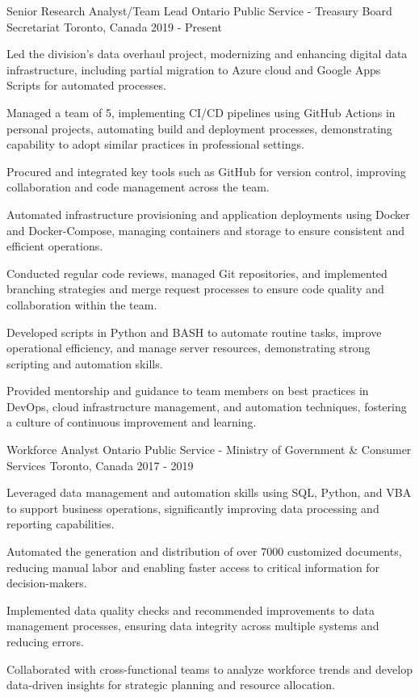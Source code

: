 \begin{cventries}
\cventry
  {Senior Research Analyst/Team Lead}
  {Ontario Public Service - Treasury Board Secretariat}
  {Toronto, Canada}
  {2019 - Present}
  {
    \begin{cvitems}
      \item Led the division's data overhaul project, modernizing and enhancing digital data infrastructure, including partial migration to Azure cloud and Google Apps Scripts for automated processes.
      \item Managed a team of 5, implementing CI/CD pipelines using GitHub Actions in personal projects, automating build and deployment processes, demonstrating capability to adopt similar practices in professional settings.
      \item Procured and integrated key tools such as GitHub for version control, improving collaboration and code management across the team.
      \item Automated infrastructure provisioning and application deployments using Docker and Docker-Compose, managing containers and storage to ensure consistent and efficient operations.
      \item Conducted regular code reviews, managed Git repositories, and implemented branching strategies and merge request processes to ensure code quality and collaboration within the team.
      \item Developed scripts in Python and BASH to automate routine tasks, improve operational efficiency, and manage server resources, demonstrating strong scripting and automation skills.
      \item Provided mentorship and guidance to team members on best practices in DevOps, cloud infrastructure management, and automation techniques, fostering a culture of continuous improvement and learning.
    \end{cvitems}
  }

\cventry
  {Workforce Analyst}
  {Ontario Public Service - Ministry of Government \& Consumer Services}
  {Toronto, Canada}
  {2017 - 2019}
  {
    \begin{cvitems}
      \item Leveraged data management and automation skills using SQL, Python, and VBA to support business operations, significantly improving data processing and reporting capabilities.
      \item Automated the generation and distribution of over 7000 customized documents, reducing manual labor and enabling faster access to critical information for decision-makers.
      \item Implemented data quality checks and recommended improvements to data management processes, ensuring data integrity across multiple systems and reducing errors.
      \item Collaborated with cross-functional teams to analyze workforce trends and develop data-driven insights for strategic planning and resource allocation.
    \end{cvitems}
  }


\end{cventries}
